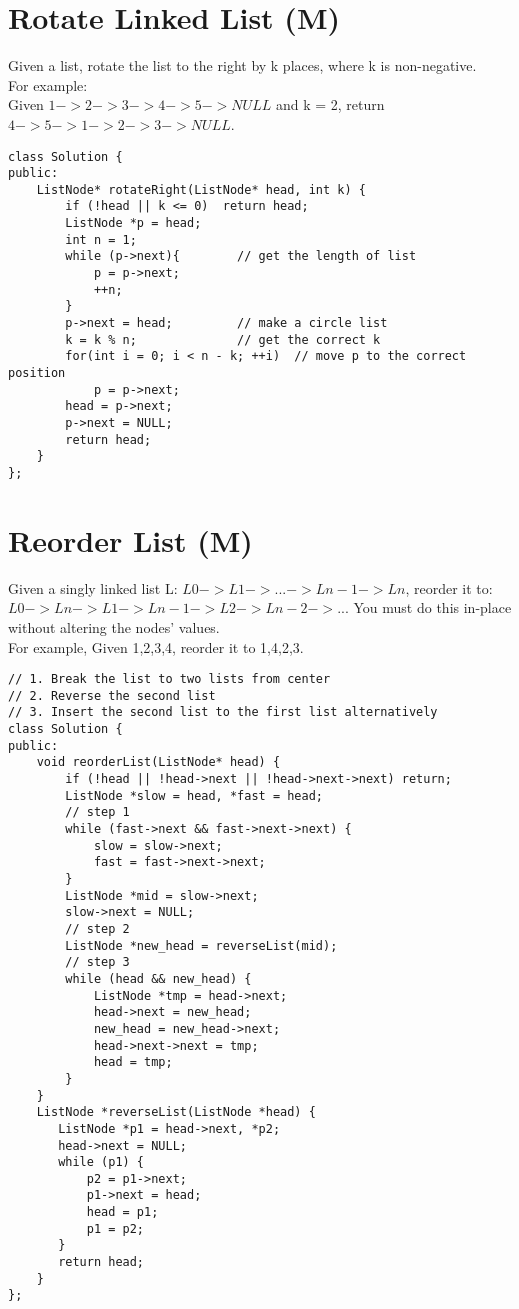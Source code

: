 \section{Rotate Linked List (M)}
Given a list, rotate the list to the right by k places, where k is non-negative.\\

For example:\\
Given $1->2->3->4->5->NULL$ and k = 2, return $4->5->1->2->3->NULL$.\\

\begin{lstlisting}
class Solution {
public:
    ListNode* rotateRight(ListNode* head, int k) {
        if (!head || k <= 0)  return head;
        ListNode *p = head;
        int n = 1;
        while (p->next){        // get the length of list
            p = p->next;
            ++n;
        }
        p->next = head;         // make a circle list
        k = k % n;              // get the correct k
        for(int i = 0; i < n - k; ++i)  // move p to the correct position
            p = p->next;
        head = p->next;
        p->next = NULL;
        return head;
    }
};
\end{lstlisting}


\section{Reorder List (M)}
Given a singly linked list L: $L0 -> L1 -> ... -> Ln-1 -> Ln$, reorder it to: $L0 -> Ln -> L1 -> Ln-1 -> L2 -> Ln-2 -> ...$ You must do this in-place without altering the nodes' values.\\

For example,
Given {1,2,3,4}, reorder it to {1,4,2,3}. \\

\begin{lstlisting}
// 1. Break the list to two lists from center
// 2. Reverse the second list
// 3. Insert the second list to the first list alternatively
class Solution {
public:
    void reorderList(ListNode* head) {
        if (!head || !head->next || !head->next->next) return;
        ListNode *slow = head, *fast = head;
        // step 1
        while (fast->next && fast->next->next) {
            slow = slow->next;
            fast = fast->next->next;
        }
        ListNode *mid = slow->next;
        slow->next = NULL;
        // step 2
        ListNode *new_head = reverseList(mid);
        // step 3
        while (head && new_head) {
            ListNode *tmp = head->next;
            head->next = new_head;
            new_head = new_head->next;
            head->next->next = tmp;
            head = tmp;
        }
    }
    ListNode *reverseList(ListNode *head) {
       ListNode *p1 = head->next, *p2;
       head->next = NULL;
       while (p1) {
           p2 = p1->next;
           p1->next = head;
           head = p1;
           p1 = p2;
       }
       return head;
    }
};
\end{lstlisting}


